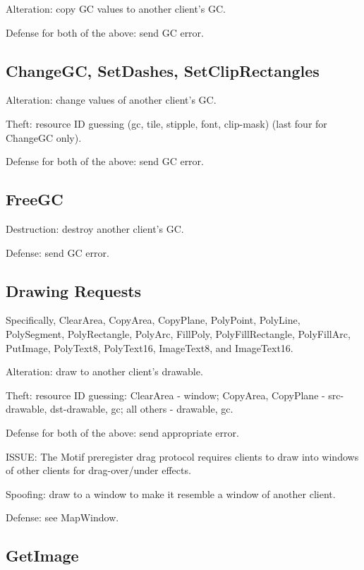 \documentclass{article}
\begin{document}
Alteration: copy GC values to another client's GC.

Defense for both of the above: send GC error.



\subsection{ChangeGC, SetDashes, SetClipRectangles}

Alteration: change values of another client's GC.

Theft: resource ID guessing (gc, tile, stipple, font, clip-mask)
(last four for ChangeGC only).

Defense for both of the above: send GC error.



\subsection{FreeGC}

Destruction: destroy another client's GC.

Defense: send GC error.



\subsection{Drawing Requests}

Specifically, ClearArea, CopyArea, CopyPlane, PolyPoint,
PolyLine, PolySegment, PolyRectangle, PolyArc, FillPoly,
PolyFillRectangle, PolyFillArc, PutImage, PolyText8, PolyText16,
ImageText8, and ImageText16.

Alteration: draw to another client's drawable.

Theft: resource ID guessing:
	ClearArea - window;
	CopyArea, CopyPlane - src-drawable, dst-drawable, gc;
	all others - drawable, gc.

Defense for both of the above: send appropriate error.

ISSUE: The Motif preregister drag protocol requires clients to draw
into windows of other clients for drag-over/under effects.

Spoofing: draw to a window to make it resemble a window of
another client.

Defense: see MapWindow.



\subsection{GetImage}
\end{document}
